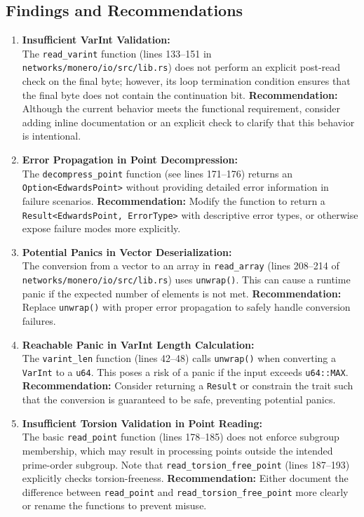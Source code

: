 \documentclass[12pt,a4paper]{article}
\begin{document}
\subsection{Findings and Recommendations}
\begin{enumerate}
    \item \textbf{Insufficient VarInt Validation:}\\
    The \texttt{read\_varint} function (lines 133--151 in \texttt{networks/monero/io/src/lib.rs}) does not perform an explicit post-read check on the final byte; however, its loop termination condition ensures that the final byte does not contain the continuation bit. 
    \textbf{Recommendation:} Although the current behavior meets the functional requirement, consider adding inline documentation or an explicit check to clarify that this behavior is intentional. 

    \item \textbf{Error Propagation in Point Decompression:}\\
    The \texttt{decompress\_point} function (see lines 171--176) returns an \texttt{Option<EdwardsPoint>} without providing detailed error information in failure scenarios. 
    \textbf{Recommendation:} Modify the function to return a \texttt{Result<EdwardsPoint, ErrorType>} with descriptive error types, or otherwise expose failure modes more explicitly.

    \item \textbf{Potential Panics in Vector Deserialization:}\\
    The conversion from a vector to an array in \texttt{read\_array} (lines 208--214 of \texttt{networks/monero/io/src/lib.rs}) uses \texttt{unwrap()}. 
    This can cause a runtime panic if the expected number of elements is not met. 
    \textbf{Recommendation:} Replace \texttt{unwrap()} with proper error propagation to safely handle conversion failures.

    \item \textbf{Reachable Panic in VarInt Length Calculation:}\\
    The \texttt{varint\_len} function (lines 42--48) calls \texttt{unwrap()} when converting a \texttt{VarInt} to a \texttt{u64}. This poses a risk of a panic if the input exceeds \texttt{u64::MAX}.
    \textbf{Recommendation:} Consider returning a \texttt{Result} or constrain the trait such that the conversion is guaranteed to be safe, preventing potential panics.

    \item \textbf{Insufficient Torsion Validation in Point Reading:}\\
    The basic \texttt{read\_point} function (lines 178--185) does not enforce subgroup membership, which may result in processing points outside the intended prime-order subgroup. 
    Note that \texttt{read\_torsion\_free\_point} (lines 187--193) explicitly checks torsion-freeness. 
    \textbf{Recommendation:} Either document the difference between \texttt{read\_point} and \texttt{read\_torsion\_free\_point} more clearly or rename the functions to prevent misuse.


\end{enumerate}
\end{document}
